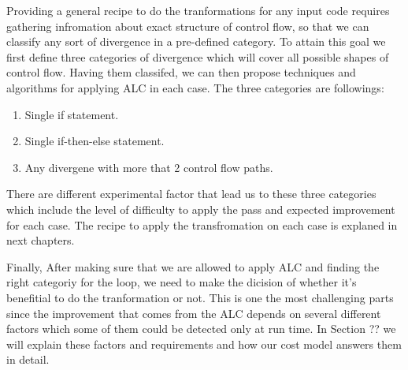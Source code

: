 \documentclass[\main/thesis.tex]{subfiles}
\begin{document}
Providing a general recipe to do the tranformations for any input code requires gathering infromation about exact structure of control flow, so that we can classify any sort of divergence in a pre-defined category. To attain this goal we first define three categories of divergence
which will cover all possible shapes of control flow. Having them classifed, we can then propose techniques and algorithms for applying ALC in each case. The three categories are followings:

\begin{enumerate}
    \item Single if statement.
    \item Single if-then-else statement.
    \item Any divergene with more that 2 control flow paths.
\end{enumerate}

There are different experimental factor that lead us to these three categories which include the level of difficulty to apply the pass and expected improvement for each case. The recipe to apply the transfromation on each case is explaned in next chapters.

Finally, After making sure that we are allowed to apply ALC and finding the right categoriy for the loop, we need to make the dicision of whether it's benefitial to do the tranformation or not. This is one the most challenging parts since the improvement that comes from the ALC depends on several different factors which some of them could be detected only at run time. In Section ?? we will explain these factors and requirements and how our cost model answers them in detail.   
\end{document}
